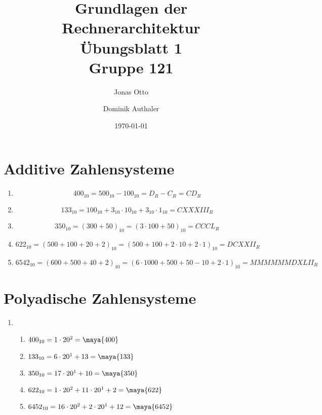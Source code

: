 \documentclass[a4paper]{article}
\title{Grundlagen der Rechnerarchitektur\\ Übungsblatt 1\\Gruppe 121\\}
\author{ Jonas Otto\\ \and Dominik Authaler \\ 
}
\date{\today}
\begin{document}
\maketitle

\section{Additive Zahlensysteme}

\begin{enumerate}[label=\Roman*)]
    \item
        \begin{equation*}
            400_{10} = 500_{10} - 100_{10} = D_R - C_R = \textit{CD}_R
        \end{equation*}
    \item
        \begin{equation*}
            133_{10} = 100_{10} + 3_{10} \cdot 10_{10} + 3_{10} \cdot 1_{10} = \textit{CXXXIII}_R
        \end{equation*}
    \item  
        \begin{equation*}
        	350_{10} = (300 + 50)_{10} = (3 \cdot 100 + 50)_{10} = \textit{CCCL}_R
        \end{equation*}	
    \item 
        \begin{equation*}
        622_{10} = (500 + 100 + 20 + 2)_{10} = (500 + 100 + 2 \cdot 10 + 2 \cdot 1)_{10} = \textit{DCXXII}_R
        \end{equation*}	
    \item 
    	\begin{equation*}
    	6542_{10} = (600 + 500 + 40 + 2)_{10} = (6 \cdot 1000 + 500 + 50 	- 10 + 2 \cdot 1)_{10} = \textit{MMMMMMDXLII}_R
        \end{equation*}
\end{enumerate}

\section{Polyadische Zahlensysteme}
\begin{enumerate}[label=\alph*)]
    \item
        \begin{enumerate}[label=\Roman*)]
            \item $ 400_{10} = 1 \cdot 20^2 = \maya{400} $ 

            \item $ 133_{10} = 6 \cdot 20^1 + 13 = \maya{133} $ 

            \item $ 350_{10} = 17 \cdot 20^1 + 10 = \maya{350} $ 

            \item $ 622_{10} = 1 \cdot 20^2 + 11 \cdot 20^1 + 2 = \maya{622} $ 

            \item $ 6452_{10} = 16 \cdot 20^2 + 2 \cdot 20^1 + 12 = \maya{6452} $ 
        \end{enumerate}
\end{enumerate}
\end{document}
